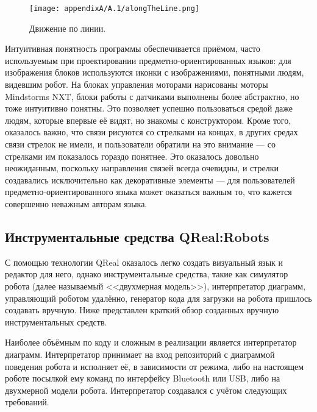 \begin{figure} [ht]
	\begin{center}
		\texttt{[image: appendixA/A.1/alongTheLine.png]}
		\caption{Движение по линии.}
		\label{image:alongTheLine}
	\end{center}
\end{figure}

Интуитивная понятность программы обеспечивается приёмом, часто используемым при проектировании 
предметно-ориентированных языков: для изображения блоков используются иконки с изображениями, 
понятными людям, видевшим робот. На блоках управления моторами нарисованы моторы Mindstorms NXT, 
блоки работы с датчиками выполнены более абстрактно, но тоже интуитивно понятны. Это 
позволяет успешно пользоваться средой даже людям, которые впервые её видят, но знакомы 
с конструктором. Кроме того, оказалось важно, что связи рисуются со стрелками на концах, 
в других средах связи стрелок не имели, и пользователи обратили на это внимание --- 
со стрелками им показалось гораздо понятнее. Это оказалось довольно неожиданным, поскольку 
направления связей всегда очевидны, и стрелки создавались исключительно как декоративные 
элементы --- для пользователей предметно-ориентированного языка может оказаться важным 
то, что кажется совершенно неважным авторам языка.

\subsection{Инструментальные средства QReal:Robots}
С помощью технологии QReal оказалось легко создать визуальный язык и редактор для него, 
однако инструментальные средства, такие как симулятор робота (далее называемый <<двухмерная модель>>), 
интерпретатор диаграмм, управляющий роботом удалённо, генератор кода для загрузки на 
робота пришлось создавать вручную. Ниже представлен краткий обзор созданных вручную 
инструментальных средств.

Наиболее объёмным по коду и сложным в реализации является интерпретатор диаграмм. 
Интерпретатор принимает на вход репозиторий с диаграммой поведения робота и исполняет 
её, в зависимости от режима, либо на настоящем роботе посылкой ему команд по интерфейсу 
Bluetooth или USB, либо на двухмерной модели робота. Интерпретатор создавался с учётом 
следующих требований.

